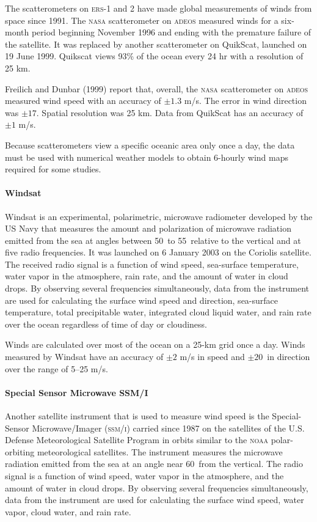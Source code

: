 The scatterometers on \textsc{ers-1} and 2 have made global
measurements of winds from space since 1991. The \textsc{nasa}
scatterometer on \textsc{adeos} measured winds
for a six-month period beginning November 1996 and ending with the
premature failure of the satellite. It was replaced by another
scatterometer on QuikScat, launched on 19 June
1999. Quikscat views 93\% of the ocean
every 24 hr with a resolution of 25 km.

Freilich and Dunbar (1999) report that, overall, the \textsc{nasa}
scatterometer on \textsc{adeos}
measured wind speed with an
accuracy of $\pm 1.3$ m/s. The
error in wind direction was $\pm17$\degrees. Spatial resolution was 25
km.  Data from QuikScat has an accuracy of $\pm 1$ m/s.

Because scatterometers view a specific oceanic
area only once a day, the data must be used with numerical weather
models to obtain 6-hourly wind maps required for some studies.

\paragraph{Windsat}
Windsat is an experimental, polarimetric, microwave
radiometer developed by the US Navy that measures the amount and
polarization of microwave radiation emitted from the sea at angles
between 50\degrees\ to 55\degrees\ relative to the vertical and at
five radio frequencies. It was launched on 6 January 2003 on the
Coriolis satellite. The received radio signal is a function of wind
speed, sea-surface temperature, water vapor in the atmosphere, rain
rate, and the amount of water in cloud drops. By observing several
frequencies simultaneously, data from the instrument are used for
calculating the surface wind speed and direction, sea-surface
temperature, total precipitable water, integrated cloud liquid water,
and rain rate over the ocean regardless of time of day or cloudiness.

Winds are calculated over most of the ocean on a 25-km grid once a
day. Winds measured by Windsat have an accuracy of $\pm 2$ m/s in
speed and $\pm 20$\degrees\ in direction over the range of 5--25 m/s.

\paragraph{Special Sensor Microwave SSM/I}
Another satellite instrument that is used to measure wind speed is the
Special-Sensor Microwave/Imager (\textsc{ssm/i}) carried since 1987 on
the satellites of the U.S. Defense Meteorological Satellite Program in
orbits similar to the \textsc{noaa} polar-orbiting meteorological
satellites. The instrument measures the microwave radiation emitted
from the sea at an angle near 60\degrees\ from the vertical. The radio
signal is a function of wind speed, water vapor in the atmosphere, and
the amount of water in cloud drops. By observing several frequencies
simultaneously, data from the instrument are used for calculating the
surface wind speed, water vapor, cloud water, and rain rate.

